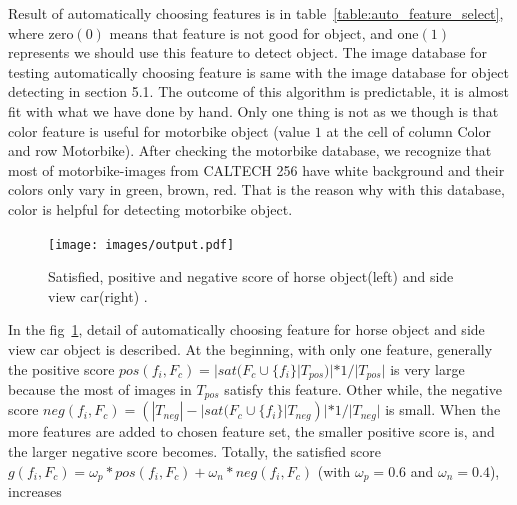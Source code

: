 Result of automatically choosing features is in table~\ref{table:auto_feature_select}, where
zero$(0)$ means that feature is not good for object, and one$(1)$
represents we should use this feature to detect object. The image
database for testing automatically choosing feature is same with the
image database for object detecting in section 5.1. The outcome of
this algorithm is predictable, it is almost fit with what we have done
by hand. Only one thing is not as we though is that color feature is
useful for motorbike object (value $1$ at the cell of column Color and
row Motorbike). After checking the motorbike database, we
recognize that most of motorbike-images from CALTECH 256 have
white background and their colors only vary in green, brown, red.
That is the reason why with this database, color is helpful for
detecting motorbike object.
\begin{figure}[ht]
  \centering
  \texttt{[image: images/output.pdf]}
  \caption{Satisfied, positive and negative score of horse object(left) and side view car(right) .}
  \label{fig:auto_selection}
\end{figure}
In the fig~\ref{fig:auto_selection}, detail of automatically choosing feature for
horse object and side view car object is described. 
At the beginning, with only one feature, generally the positive score $ pos(f_i,F_c) = |sat(F_c \cup \{f_i\}|T_{pos})| * 1/|T_{pos}|$  is very large because the most of images in $T_{pos}$ satisfy
this feature. Other while, the negative score $neg(f_i,F_c) = (|T_{neg}| - |sat(F_c \cup \{f_i\}|T_{neg})| * 1/|T_{neg}|$ is small. When the more features are
added to chosen feature set, the smaller positive score is, and the
larger negative score becomes. Totally, the satisfied score $g(f_i,F_c) = \omega_p * pos(f_i,F_c) + \omega_n * neg(f_i,F_c)$ (with $\omega_p = 0.6$ and $\omega_n = 0.4$), increases

